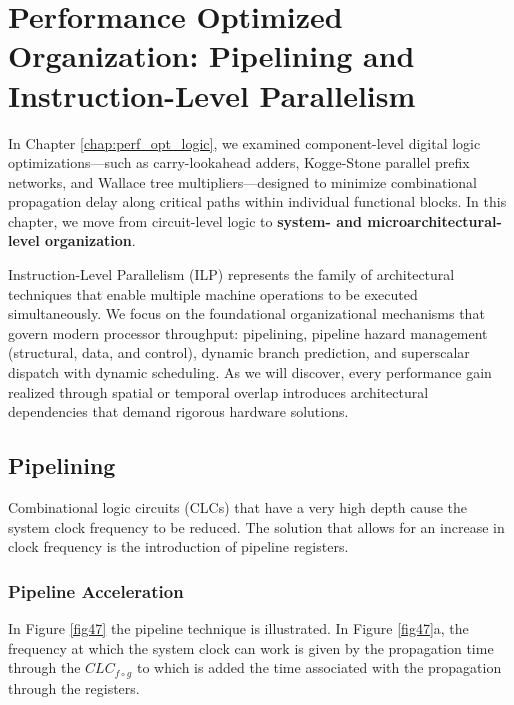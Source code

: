 \chapter{Performance Optimized Organization: Pipelining and Instruction-Level Parallelism}\label{lect5}\label{chap:perf_opt_org}
\localtoc

In Chapter \ref{chap:perf_opt_logic}, we examined component-level digital logic optimizations---such as carry-lookahead adders, Kogge-Stone parallel prefix networks, and Wallace tree multipliers---designed to minimize combinational propagation delay along critical paths within individual functional blocks. In this chapter, we move from circuit-level logic to \textbf{system- and microarchitectural-level organization}. 

Instruction-Level Parallelism (ILP) represents the family of architectural techniques that enable multiple machine operations to be executed simultaneously. We focus on the foundational organizational mechanisms that govern modern processor throughput: pipelining, pipeline hazard management (structural, data, and control), dynamic branch prediction, and superscalar dispatch with dynamic scheduling. As we will discover, every performance gain realized through spatial or temporal overlap introduces architectural dependencies that demand rigorous hardware solutions.

\section{Pipelining}

Combinational logic circuits (CLCs) that have a very high depth cause the system clock frequency to be reduced. The solution that allows for an increase in clock frequency is the introduction of pipeline registers.


\subsection{Pipeline Acceleration}

In Figure \ref{fig47} the pipeline technique is illustrated. In Figure \ref{fig47}a, the frequency at which the system clock can work is given by the propagation time through the $CLC_{f \circ g}$ to which is added the time associated with the propagation through the registers.

